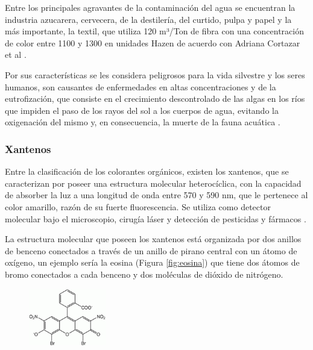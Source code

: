\documentclass[12pt]{article}
\begin{document}
 Entre los principales agravantes de la contaminación del agua se encuentran la industria azucarera, cervecera, de la destilería, del curtido, pulpa y papel y la más importante, la textil, que utiliza 120 m³/Ton de fibra con una concentración de color entre 1100 y 1300 en unidades Hazen de acuerdo con Adriana Cortazar et al \cite{IEEEreferencias:Ref3}.
\vspace{1em} %
 
 Por sus características se les considera peligrosos para la vida silvestre y los seres humanos, son causantes de enfermedades en altas concentraciones y de la eutrofización, que consiste en el crecimiento descontrolado de las algas en los ríos que impiden el paso de los rayos del sol a los cuerpos de agua, evitando la oxigenación del mismo y, en consecuencia, la muerte de la fauna acuática \cite{IEEEreferencias:Ref5}.
\vspace{1em} %

    \subsubsection{Xantenos}
    Entre la clasificación de los colorantes orgánicos, existen los xantenos, que se caracterizan por poseer una estructura molecular heterocíclica, con la capacidad de absorber la luz a una longitud de onda entre 570 y 590 nm, que le pertenece al color amarillo, razón de su fuerte fluorescencia. Se utiliza como detector molecular bajo el microscopio, cirugía láser y detección de pesticidas y fármacos \cite{IEEEreferencias:XANTENOS}. \vspace{1em} %
    
    La estructura molecular que poseen los xantenos está organizada por dos anillos de benceno conectados a través de un anillo de pirano central con un átomo de oxígeno, un ejemplo sería la eosina (Figura \ref{fig:eosina}) que tiene dos átomos de bromo conectados a cada benceno y dos moléculas de dióxido de nitrógeno.
     \begin{figure}[H]
    	   \begin{center}
     	  	\includegraphics[width = 0.3\textwidth]{Imagenes/eosina.png}
    	   \end{center} 
        \end{figure}
\end{document}
